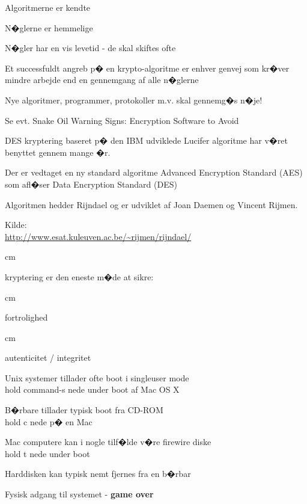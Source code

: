 \documentclass[20pt,landscape,a4paper,footrule]{foils}
\begin{document}

\begin{list1}
\item Algoritmerne er kendte
\item N�glerne er hemmelige
\item N�gler har en vis levetid - de skal skiftes ofte
\item Et successfuldt angreb p� en krypto-algoritme er enhver genvej
  som kr�ver mindre arbejde end en gennemgang af alle n�glerne
\item Nye algoritmer, programmer, protokoller m.v. skal gennemg�s n�je!
\item Se evt. Snake Oil Warning Signs:
Encryption Software to Avoid
\end{list1}



\begin{list1}
\item DES kryptering baseret p� den IBM udviklede Lucifer algoritme
  har v�ret benyttet gennem mange �r.
\item Der er vedtaget en ny standard algoritme Advanced Encryption
  Standard (AES) som afl�ser Data Encryption Standard (DES)
\item Algoritmen hedder Rijndael og er udviklet
af Joan Daemen og Vincent Rijmen.

\item Kilde:
\\
\href{http://www.esat.kuleuven.ac.be/~rijmen/rijndael/}
{http://www.esat.kuleuven.ac.be/\~{}rijmen/rijndael/}
\end{list1}



 cm
\centerline{\hlkbig kryptering er den eneste m�de at sikre:}
 cm
\centerline{\hlkbig fortrolighed}
 cm
\centerline{\hlkbig autenticitet / integritet}



\begin{list1}
\item Unix systemer tillader ofte boot i singleuser mode\\
hold command-s nede under boot af Mac OS X
\item B�rbare tillader typisk boot fra CD-ROM\\
hold c nede p� en Mac
\item Mac computere kan i nogle tilf�lde v�re firewire diske\\
hold t nede under boot
\item Harddisken kan typisk nemt fjernes fra en b�rbar
\end{list1}
\pause
\centerline{Fysisk adgang til systemet - {\bf game over}}
\end{document}
